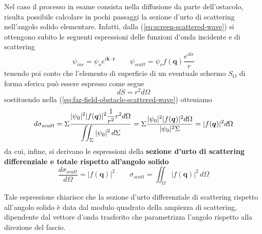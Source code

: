 Nel caso il processo in esame consista nella diffusione da parte dell'ostacolo, risulta possibile calcolare in pochi passaggi la sezione d'urto di scattering nell'angolo solido elementare.
Infatti, dalla (\ref{eq:screen-scattered-wave}) si ottengono subito le seguenti espressioni delle funzioni d'onda incidente e di scattering
\[
	\psi_{inc} = \psi_o e^{i \bm{k} \cdot \bm{r}} \qquad
	\psi_{scatt} = \psi_o f(\bm{q})\frac{e^{ikr}}{r}
\] tenendo poi conto che l'elemento di superficie di un eventuale schermo $S_O$ di forma sferica può essere espresso come segue \[
																																	dS = r^2 d \Omega
\] sostituendo nella (\ref{eq:far-field-obstacle-scattered-wave}) otteniamo
\[
	d \sigma_{scatt} = \Sigma \fraclarg{|\psi_0|^2|f(\bm{q})|^2\frac{1}{r^2}r^2 d \Omega}{\iint_{\Sigma}|\psi_0|^2 \, d \Sigma}
	= \Sigma \frac{|\psi_0|^2|f(\bm{q})|^2 d \Omega}{|\psi_0|^2 \Sigma}
	= |f(\bm{q})|^2 d \Omega
\]
da cui, infine, si derivano le espressioni della \textbf{sezione d'urto di scattering differenziale e totale rispetto all'angolo solido}
\begin{equation}
	\frac{d \sigma_{scatt}}{d \Omega} = |f(\bm{q})|^2 \qquad
	\sigma_{scatt} = \iint_{\Omega}|f(\bm{q})|^2 \, d \Omega
	\label{eq:scattering-cross-section-solid-angle}
\end{equation}

Tale espressione chiarisce che la sezione d'urto differenziale di scattering rispetto all'angolo solido è data dal
modulo quadrato della ampiezza di scattering, dipendente dal vettore d'onda trasferito che parametrizza l'angolo
rispetto alla direzione del fascio.

